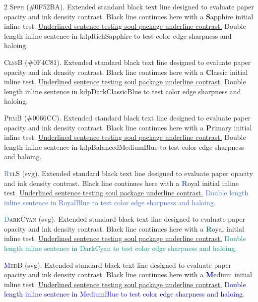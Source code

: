 \begin{multicols}{2}
\lettrine[lines=2]{\textcolor{kdpRichSapphire}{S}}{pph} (\#0F52BA). Extended standard black text line designed to evaluate paper opacity and ink density contrast. Black line continues here with a \textbf{\textcolor{kdpRichSapphire}{S}}apphire initial inline test. \ul{Underlined sentence testing soul package underline contrast.} \textcolor{kdpRichSapphire}{Double length inline sentence in kdpRichSapphire to test color edge sharpness and haloing.}


\lettrine[lines=2]{\textcolor{kdpDarkClassicBlue}{C}}{lssB} (\#0F4C81). Extended standard black text line designed to evaluate paper opacity and ink density contrast. Black line continues here with a \textbf{\textcolor{kdpDarkClassicBlue}{C}}lassic initial inline test. \ul{Underlined sentence testing soul package underline contrast.} \textcolor{kdpDarkClassicBlue}{Double length inline sentence in kdpDarkClassicBlue to test color edge sharpness and haloing.}


\lettrine[lines=2]{\textcolor{kdpBalancedMediumBlue}{P}}{rmB} (\#0066CC). Extended standard black text line designed to evaluate paper opacity and ink density contrast. Black line continues here with a \textbf{\textcolor{kdpBalancedMediumBlue}{P}}rimary initial inline test. \ul{Underlined sentence testing soul package underline contrast.} \textcolor{kdpBalancedMediumBlue}{Double length inline sentence in kdpBalancedMediumBlue to test color edge sharpness and haloing.}


\lettrine[lines=2]{\textcolor{RoyalBlue}{R}}{ylS} (svg). Extended standard black text line designed to evaluate paper opacity and ink density contrast. Black line continues here with a \textbf{\textcolor{RoyalBlue}{R}}oyal initial inline test. \ul{Underlined sentence testing soul package underline contrast.} \textcolor{RoyalBlue}{Double length inline sentence in RoyalBlue to test color edge sharpness and haloing.}


\lettrine[lines=2]{\textcolor{DarkCyan}{D}}{arkCyan} (svg). Extended standard black text line designed to evaluate paper opacity and ink density contrast. Black line continues here with a \textbf{\textcolor{DarkCyan}{R}}oyal initial inline test. \ul{Underlined sentence testing soul package underline contrast.} \textcolor{DarkCyan}{Double length inline sentence in DarkCyan to test color edge sharpness and haloing.}


\lettrine[lines=2]{\textcolor{MediumBlue}{M}}{edB} (svg). Extended standard black text line designed to evaluate paper opacity and ink density contrast. Black line continues here with a \textbf{\textcolor{MediumBlue}{M}}edium initial inline test. \ul{Underlined sentence testing soul package underline contrast.} \textcolor{MediumBlue}{Double length inline sentence in MediumBlue to test color edge sharpness and haloing.}



\end{multicols}
